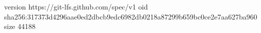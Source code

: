 version https://git-lfs.github.com/spec/v1
oid sha256:317373d4296aae0ed2dbcb9edc6982db0218a87299b659bc0ce2e7aa627ba960
size 44188
